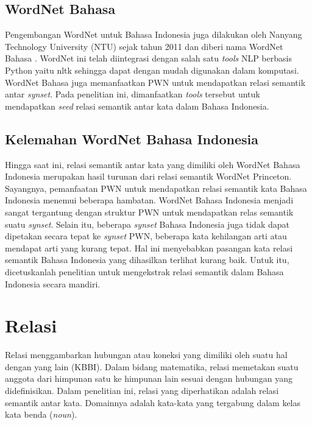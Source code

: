 \subsection{WordNet Bahasa}
Pengembangan WordNet untuk Bahasa Indonesia juga dilakukan oleh Nanyang Technology University (NTU) sejak tahun 2011 dan diberi nama WordNet Bahasa \citep{paper.bond}. WordNet ini telah diintegrasi dengan salah satu \textit{tools} NLP berbasis Python yaitu nltk sehingga dapat dengan mudah digunakan dalam komputasi. WordNet Bahasa juga memanfaatkan PWN untuk mendapatkan relasi semantik antar \textit{synset}. Pada penelitian ini, dimanfaatkan \textit{tools} tersebut untuk mendapatkan \textit{seed} relasi semantik antar kata dalam Bahasa Indonesia.

\subsection{Kelemahan WordNet Bahasa Indonesia}
Hingga saat ini, relasi semantik antar kata yang dimiliki oleh WordNet Bahasa Indonesia merupakan hasil turunan dari relasi semantik WordNet Princeton. Sayangnya, pemanfaatan PWN untuk mendapatkan relasi semantik kata Bahasa Indonesia menemui beberapa hambatan. WordNet Bahasa Indonesia menjadi sangat tergantung dengan struktur PWN untuk mendapatkan relas semantik suatu \textit{synset}. Selain itu, beberapa \textit{synset} Bahasa Indonesia juga tidak dapat dipetakan secara tepat ke \textit{synset} PWN, beberapa kata kehilangan arti atau mendapat arti yang kurang tepat. Hal ini menyebabkan pasangan kata relasi semantik Bahasa Indonesia yang dihasilkan terlihat kurang baik. Untuk itu, dicetuskanlah penelitian untuk mengekstrak relasi semantik dalam Bahasa Indonesia secara mandiri. 

\section{Relasi}
Relasi menggambarkan hubungan atau koneksi yang dimiliki oleh suatu hal dengan yang lain (KBBI). Dalam bidang matematika, relasi memetakan suatu anggota dari himpunan satu ke himpunan lain sesuai dengan hubungan yang didefinisikan. Dalam penelitian ini, relasi yang diperhatikan adalah relasi semantik antar kata. Domainnya adalah kata-kata yang tergabung dalam kelas kata benda (\textit{noun}).

